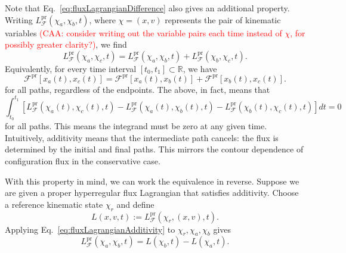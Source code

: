 \documentclass[nofootinbib,aps,pre]{revtex4-2}
\begin{document}
Note that Eq.~\eqref{eq:fluxLagrangianDifference} also gives an additional
property. Writing $L_{\mathcal{F}}^{\mathrm{pr}}(\chi_a,\chi_b,t)$, where $\chi = (x, v)$ represents the pair of kinematic variables \textcolor{red}{(CAA: consider writing out the variable pairs each time instead of $\chi$, for possibly greater clarity?)}, we find
\begin{equation}\label{eq:fluxLagrangianAdditivity}
	L_{\mathcal{F}}^{\mathrm{pr}}(\chi_a,\chi_c,t)
	=
	L_{\mathcal{F}}^{\mathrm{pr}}(\chi_a,\chi_b,t)
	+
	L_{\mathcal{F}}^{\mathrm{pr}}(\chi_b,\chi_c,t).
\end{equation}
Equivalently, for every time interval $[t_0,t_1] \subset \mathbb{R}$, we have
\begin{equation}\label{eq:fluxActionAdditivity}
	\mathcal{F}^{\mathrm{pr}}[x_a(t),x_c(t)]
	=
	\mathcal{F}^{\mathrm{pr}}[x_a(t),x_b(t)]
	+
	\mathcal{F}^{\mathrm{pr}}[x_b(t),x_c(t)].
\end{equation}
for all paths, regardless of the endpoints. The above, in fact, means that 
\begin{equation}\int_{t_0}^{t_1}
\left[
L_{\mathcal{F}}^{\mathrm{pr}}(\chi_a(t),\chi_c(t),t)
-L_{\mathcal{F}}^{\mathrm{pr}}(\chi_a(t),\chi_b(t),t)
-L_{\mathcal{F}}^{\mathrm{pr}}(\chi_b(t),\chi_c(t),t)
\right]dt=0
\end{equation}
for all paths. This means the integrand must be zero at any given time. Intuitively, additivity means that the intermediate path cancels: the flux is determined by the initial and final paths. This mirrors the contour dependence of configuration flux in the conservative case.

With this property in mind, we can work the equivalence in reverse. Suppose we are given a proper hyperregular flux Lagrangian that satisfies additivity. Choose a reference kinematic state $\chi_r$ and
define
\begin{equation}
	L(x,v,t)
	:=
	L_{\mathcal{F}}^{\mathrm{pr}}(\chi_r,(x,v),t).
\end{equation}
Applying Eq.~\eqref{eq:fluxLagrangianAdditivity} to $\chi_r,\chi_a,\chi_b$ gives
\begin{equation}
	L_{\mathcal{F}}^{\mathrm{pr}}(\chi_a,\chi_b,t)=L(\chi_b,t)-L(\chi_a,t).
\end{equation}
\end{document}
